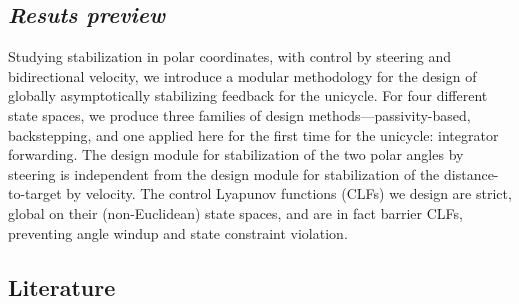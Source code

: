 \documentclass[journal,twoside,web]{ieeecolor}
\theoremstyle{definition}
\begin{document}
\subsection{\em Resuts preview}  Studying stabilization in polar coordinates, with control by steering and bidirectional velocity, 
we introduce a modular methodology for the design of globally asymptotically stabilizing feedback for the unicycle. For four different state spaces, we produce  three families of design methods---passivity-based, backstepping, and one applied here for the first time for the unicycle: integrator forwarding. The design module for stabilization of the two polar angles by steering is independent from the design module for stabilization of the distance-to-target by velocity. 
The control Lyapunov functions (CLFs) we design are strict, global on their (non-Euclidean) state spaces, and are in fact barrier CLFs, preventing angle windup and state constraint violation.  


\subsection{Literature}
\end{document}
